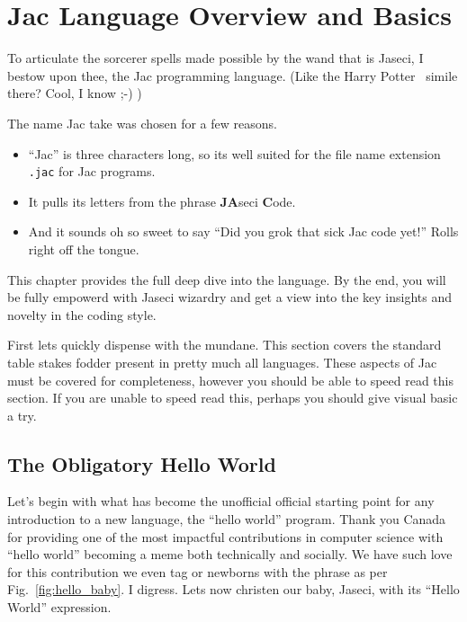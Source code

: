 \chapter{Jac Language Overview and Basics}

To articulate the sorcerer spells made possible by the wand that is Jaseci, I bestow upon thee, the Jac programming language. (Like the Harry Potter~\cite{harrypotter} simile there? Cool, I know ;-) )
\par
The name Jac take was chosen for a few reasons.
\begin{itemize}
    \item ``Jac'' is three characters long, so its well suited for the file name extension \texttt{.jac} for Jac programs.
    \item It pulls its letters from the phrase \textbf{JA}seci \textbf{C}ode.
    \item And it sounds oh so sweet to say ``Did you \gls{grok} that \gls{sick} Jac code yet!'' Rolls right off the tongue.
\end{itemize}
\par
This chapter provides the full deep dive into the language. By the end, you will be fully empowerd with Jaseci wizardry and get a view into the key insights and novelty in the coding style.

First lets quickly dispense with the mundane. This section covers the standard table stakes fodder present in pretty much all languages. These aspects of Jac must be covered for completeness, however you should be able to speed read this section.  If you are unable to speed read this, perhaps you should give visual basic a try.

\section{The Obligatory Hello World}
\printfigHelloWorldBaby
Let's begin with what has become the unofficial official starting point for any introduction to a new language, the ``hello world'' program. Thank you Canada for providing one of the most impactful contributions in computer science with ``hello world'' becoming a meme both technically and socially. We have such love for this contribution we even tag or newborns with the phrase as per Fig.~\ref{fig:hello_baby}. I digress. Lets now \gls{christen} our baby, Jaseci, with its ``Hello World'' expression.

